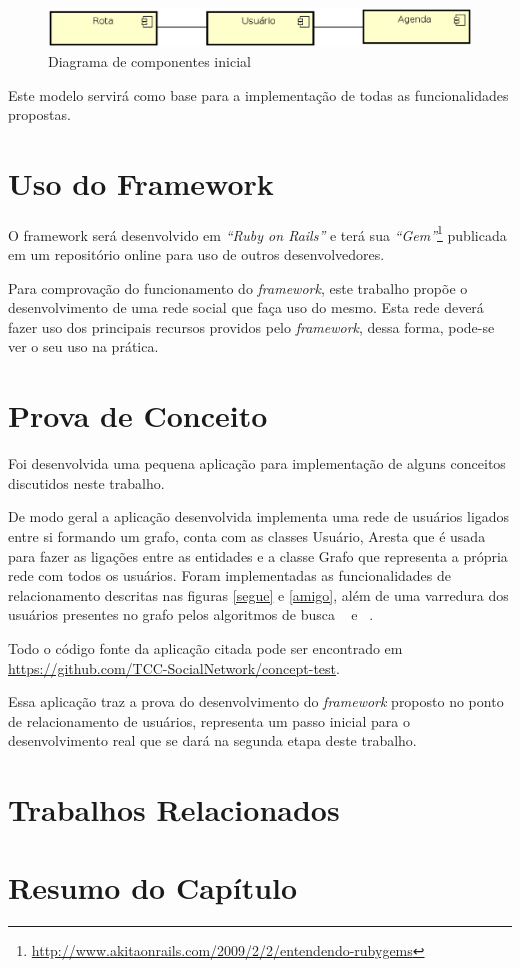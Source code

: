 \begin{figure}[!h]
	\centering
	\includegraphics[scale=0.55]{figuras/capitulo5/diagrama_componentes.eps}
	\caption{Diagrama de componentes inicial}
	\label{diagrama de componentes}
\end{figure}

Este modelo servirá como base para a implementação de todas as funcionalidades propostas.

\section{Uso do Framework}

O framework será desenvolvido em \textit{``Ruby on Rails''} e terá sua \textit{``Gem''}\footnote{\url{http://www.akitaonrails.com/2009/2/2/entendendo-rubygems}} publicada em um repositório online para uso de outros desenvolvedores.

Para comprovação do funcionamento do \textit{framework}, este trabalho propõe o desenvolvimento de uma rede social que faça uso do mesmo. Esta rede deverá fazer uso dos principais recursos providos pelo \textit{framework}, dessa forma, pode-se ver o seu uso na prática.

\section{Prova de Conceito}

Foi desenvolvida uma pequena aplicação para implementação de alguns conceitos discutidos neste trabalho.

De modo geral a aplicação desenvolvida implementa uma rede de usuários ligados entre si formando um grafo, conta com as classes Usuário, Aresta que é usada para fazer as ligações entre as entidades e a classe Grafo que representa a própria rede com todos os usuários. Foram implementadas as funcionalidades de relacionamento descritas nas figuras \ref{segue} e \ref{amigo}, além de uma varredura dos usuários presentes no grafo pelos algoritmos de busca ~ e ~.

Todo o código fonte da aplicação citada pode ser encontrado em \url{https://github.com/TCC-SocialNetwork/concept-test}.

Essa aplicação traz a prova do desenvolvimento do \textit{framework} proposto no ponto de relacionamento de usuários, representa um passo inicial para o desenvolvimento real que se dará na segunda etapa deste trabalho.

\section{Trabalhos Relacionados}

\section{Resumo do Capítulo}
